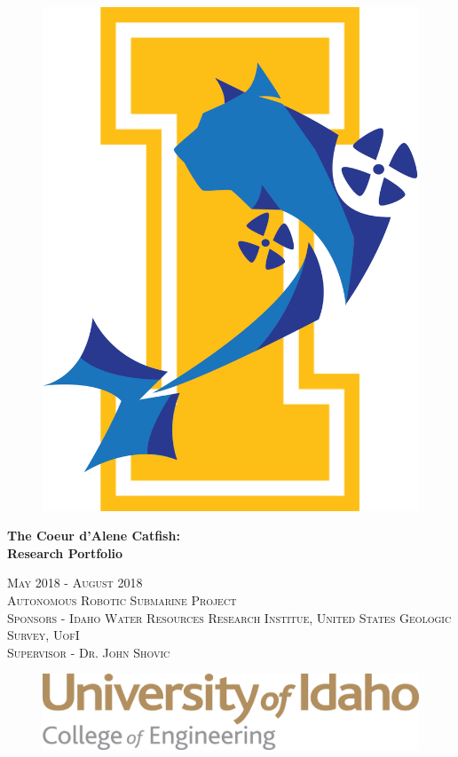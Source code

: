 \documentclass[12pt]{article}
\begin{document}
	\begin{titlepage}
		\centering	
    
    \begin{figure}[h]
      \centering
      \includegraphics[width=0.38\linewidth]{assets/New_Logov1.png}
    \end{figure} 
  
  {\huge\bfseries The Coeur d'Alene Catfish: \\ Research Portfolio\par}
    
    \title{}
    \date{\vspace{-5ex}} %
    \author{%
    	\\Team Manager\\
    	\and {}\\Designer\\
    }
    \let\newpage\relax\maketitle %
    \maketitle		
    
    \vspace{1cm} 
    
    {\scshape\Large 
      May 2018 - August 2018 \\
      Autonomous Robotic Submarine Project\\ 
      Sponsors - Idaho Water Resources Research Institue, United States Geologic Survey, UofI \\
      Supervisor - Dr. John Shovic
      \par}
    
     \vspace{1cm} 
    
    \begin{figure}[h]
      \centering
      \includegraphics[width=0.6\linewidth]{assets/uislogan.png}
    \end{figure} 
  
		\vfill		
	\end{titlepage}
\end{document}
